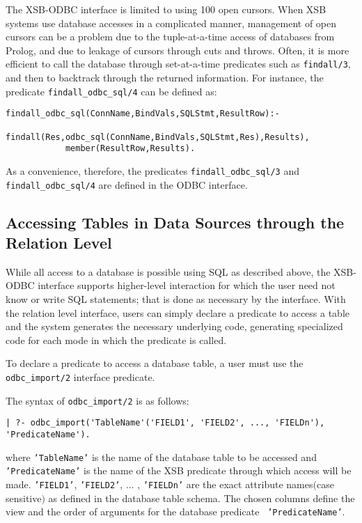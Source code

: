 The XSB-ODBC interface is limited to using 100 open cursors.  When XSB
systems use database accesses in a complicated manner, management of
open cursors can be a problem due to the tuple-at-a-time access of
databases from Prolog, and due to leakage of cursors through cuts and
throws.  Often, it is more efficient to call the database through
set-at-a-time predicates such as {\tt findall/3}, and then to
backtrack through the returned information.  For instance, 
the predicate {\tt findall\_odbc\_sql/4} can be defined as:
%
\begin{verbatim}
findall_odbc_sql(ConnName,BindVals,SQLStmt,ResultRow):- 
            findall(Res,odbc_sql(ConnName,BindVals,SQLStmt,Res),Results),
            member(ResultRow,Results).
\end{verbatim}
%
As a convenience, therefore, the predicates {\tt findall\_odbc\_sql/3}
and {\tt findall\_odbc\_sql/4} are defined in the ODBC interface.

\subsection{Accessing Tables in Data Sources through the Relation Level}

While all access to a database is possible using SQL as described
above, the XSB-ODBC interface supports higher-level interaction for
which the user need not know or write SQL statements; that is done as
necessary by the interface.  With the relation level interface, users
can simply declare a predicate to access a table and the system
generates the necessary underlying code, generating specialized code
for each mode in which the predicate is called.

To declare a predicate to access a database table, a user must use the
{\tt odbc\_import/2} interface predicate.

The syntax of  {\tt odbc\_import/2} is as follows:

\begin{verbatim}
| ?- odbc_import('TableName'('FIELD1', 'FIELD2', ..., 'FIELDn'), 'PredicateName').
\end{verbatim}
\noindent
where {\tt 'TableName'} is the name of the database table to be
accessed and {\tt 'PredicateName'} is the name of the XSB predicate
through which access will be made. {\tt 'FIELD1'}, {\tt 'FIELD2'},
... , {\tt 'FIELDn'} are the exact attribute names$($case sensitive$)$
as defined in the database table schema.  The chosen columns define
the view and the order of arguments for the database predicate {\tt
'PredicateName'}.
 
